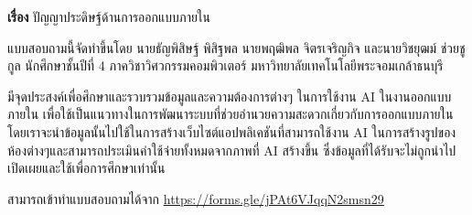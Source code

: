 \documentclass[12pt,oneside,openright,a4paper]{cpe-thai-project}
\begin{document}
\textbf{เรื่อง} ปัญญาประดิษฐ์ด้านการออกแบบภายใน

\hspace {18pt} แบบสอบถามนี้จัดทำขึ้นโดย นายธัญพิสิษฐ์ พิสิฐพล นายพฤฒิพล จิตรเจริญกิจ และนายวิชยุฒม์ 
ช่วยชูกูล นักศึกษาชั้นปีที่ 4 ภาควิชาวิศวกรรมคอมพิวเตอร์ มหาวิทยาลัยเทคโนโลยีพระจอมเกล้าธนบุรี

\hspace {18pt}มีจุดประสงค์เพื่อศึกษาและรวบรวมข้อมูลและความต้องการต่างๆ ในการใช้งาน AI ในงานออกแบบภายใน เพื่อใช้เป็นแนวทางในการพัฒนาระบบที่ช่วยอำนวยความสะดวกเกี่ยวกับการออกแบบภายใน โดยเราจะนำข้อมูลนั้นไปใช้ในการสร้างเว็บไซต์แอปพลิเคชันที่สามารถใช้งาน AI ในการสร้างรูปของห้องต่างๆและสามารถประเมินค่าใช้จ่ายทั้งหมดจากภาพที่ AI สร้างขึ้น ซึ่งข้อมูลที่ได้รับจะไม่ถูกนำไปเปิดเผยและใช้เพื่อการศึกษาเท่านั้น 

\hspace {18pt} สามารถเข้าทำแบบสอบถามได้จาก \url{https://forms.gle/jPAt6VJqqN2smsn29}
\end{document}
